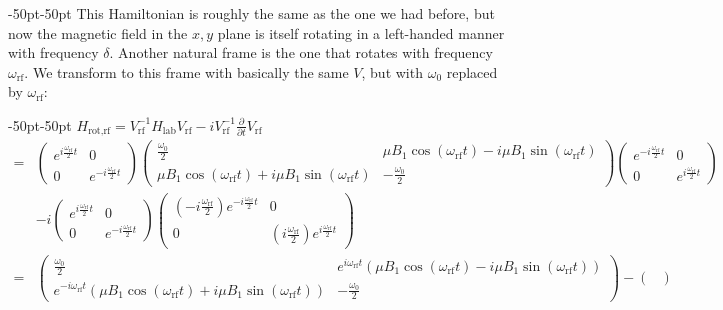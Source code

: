 \documentclass{../lab}
\begin{document}
\begin{enumerate}
\begin{enumerate}
\begin{adjustwidth}{-50pt}{-50pt}
This Hamiltonian is roughly the same as the one we had before, but now the magnetic field in the $x,y$ plane is itself rotating in a left-handed manner with frequency $\delta$. Another natural frame is the one that rotates with frequency $\omega_\text{rf}$. We transform to this frame with basically the same $V$, but with $\omega_\text{0}$ replaced by $\omega_\text{rf}$:
\end{adjustwidth}
\begin{adjustwidth}{-50pt}{-50pt}
$H_\text{rot,rf} = V_\text{rf}^{-1} H_\text{lab} V_\text{rf} - i V_\text{rf}^{-1}\frac{\partial}{\partial t} V_\text{rf}$
\begin{align*}
	=& \begin{pmatrix}
		e^{i \frac{\omega_\text{rf}}{2}t} & 0 \\
		0 & e^{-i \frac{\omega_\text{rf}}{2}t}
	\end{pmatrix}
	\begin{pmatrix}
		\frac{\omega_\text{0}}{2} & \mu B_1 \cos(\omega_\text{rf} t) - i \mu B_1 \sin(\omega_\text{rf} t) \\
		 \mu B_1 \cos(\omega_\text{rf} t) + i \mu B_1 \sin(\omega_\text{rf} t)& - \frac{\omega_\text{0}}{2}
	\end{pmatrix}
	\begin{pmatrix}
		e^{-i \frac{\omega_\text{rf}}{2}t} & 0 \\
		0 & e^{i \frac{\omega_\text{rf}}{2}t}
	\end{pmatrix} \\
	&- i 
	\begin{pmatrix}
		e^{i \frac{\omega_\text{rf}}{2}t} & 0 \\
		0 & e^{-i \frac{\omega_\text{rf}}{2}t}
	\end{pmatrix}
	\begin{pmatrix}
		(-i \frac{\omega_\text{rf}}{2}) e^{-i \frac{\omega_\text{rf}}{2}t} & 0 \\
		0 &(i \frac{\omega_\text{rf}}{2}) e^{i \frac{\omega_\text{rf}}{2}t}
	\end{pmatrix} \\
	=& 
	\begin{pmatrix}
		\frac{\omega_\text{0}}{2} & e^{i \omega_\text{rf}t} \left(\mu B_1 \cos(\omega_\text{rf} t) - i\mu B_1 \sin(\omega_\text{rf} t) \right) \\
		 e^{-i \omega_\text{rf}t} \left( \mu B_1 \cos(\omega_\text{rf} t) + i \mu B_1 \sin(\omega_\text{rf} t) \right) & -\frac{\omega_\text{0}}{2} 
	\end{pmatrix}
	-
	\begin{pmatrix}

\end{pmatrix}
\end{align*}
\end{adjustwidth}
\end{enumerate}
\end{enumerate}
\end{document}
